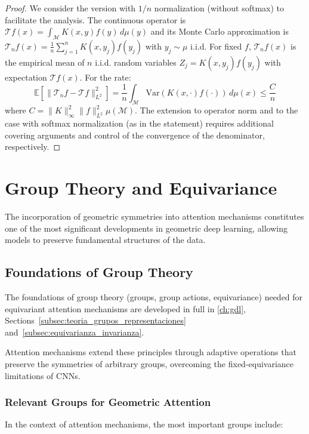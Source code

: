 \begin{proof}
We consider the version with $1/n$ normalization (without softmax) to facilitate the analysis. The continuous operator is $\mathcal{T}f(x) = \int_\mathcal{M} K(x,y) f(y)\, d\mu(y)$ and its Monte Carlo approximation is $\mathcal{T}_n f(x) = \frac{1}{n}\sum_{j=1}^n K(x, y_j) f(y_j)$ with $y_j \sim \mu$ i.i.d. For fixed $f$, $\mathcal{T}_n f(x)$ is the empirical mean of $n$ i.i.d. random variables $Z_j = K(x, y_j)f(y_j)$ with expectation $\mathcal{T}f(x)$. For the rate:
\[
\mathbb{E}[\|\mathcal{T}_n f - \mathcal{T}f\|_{L^2}^2] = \frac{1}{n}\int_\mathcal{M} \text{Var}(K(x,\cdot)f(\cdot))\, d\mu(x) \leq \frac{C}{n}
\]
where $C = \|K\|_\infty^2 \|f\|_{L^2}^2 \mu(\mathcal{M})$. The extension to operator norm and to the case with softmax normalization (as in the statement) requires additional covering arguments and control of the convergence of the denominator, respectively.
\end{proof}

\section{Group Theory and Equivariance}

The incorporation of geometric symmetries into attention mechanisms constitutes one of the most significant developments in geometric deep learning, allowing models to preserve fundamental structures of the data.

\subsection{Foundations of Group Theory}

The foundations of group theory (groups, group actions, equivariance) needed for equivariant attention mechanisms are developed in full in \autoref{ch:gdl}, Sections~\ref{subsec:teoria_grupos_representaciones} and~\ref{subsec:equivarianza_invarianza}.

Attention mechanisms extend these principles through adaptive operations that preserve the symmetries of arbitrary groups, overcoming the fixed-equivariance limitations of \glspl{CNN}.

\subsubsection{Relevant Groups for Geometric Attention}

In the context of attention mechanisms, the most important groups include:

